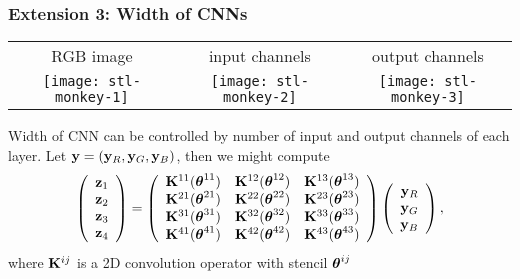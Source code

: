 \documentclass[12pt,fleqn,handout]{beamer}
\begin{document}
\begin{frame}\frametitle{Extension 3: Width of CNNs}
	
	\begin{center}
		\begin{tabular}{ccc}
			RGB image & input channels & output channels\\ 
			\texttt{[image: stl-monkey-1]}
			&
			\texttt{[image: stl-monkey-2]}
			&
			\texttt{[image: stl-monkey-3]}
		\end{tabular}
	\end{center}
	
	Width of CNN can be controlled by number of input and output channels of each layer. Let ${\bf y} = ({\bf y}_R, {\bf y}_G, {\bf y}_B)$, then we might compute
	$$
		\left(
			\begin{array}{r}
				{\bf z}_1 \\
				{\bf z}_2 \\
				{\bf z}_3 \\
				{\bf z}_4
			\end{array}
		\right)
		= 
		\left(
		\begin{array}{rrr}
			{\bf K}^{11}({\boldsymbol \theta}^{11}) &  {\bf K}^{12}({\boldsymbol \theta}^{12}) & {\bf K}^{13}({\boldsymbol \theta}^{13})\\
			{\bf K}^{21}({\boldsymbol \theta}^{21}) &  {\bf K}^{22}({\boldsymbol \theta}^{22}) & {\bf K}^{23}({\boldsymbol \theta}^{23})\\
			{\bf K}^{31}({\boldsymbol \theta}^{31}) &  {\bf K}^{32}({\boldsymbol \theta}^{32}) & {\bf K}^{33}({\boldsymbol \theta}^{33})\\
			{\bf K}^{41}({\boldsymbol \theta}^{41}) &  {\bf K}^{42}({\boldsymbol \theta}^{42}) & {\bf K}^{43}({\boldsymbol \theta}^{43})\\
		\end{array}
		\right)
		\left(
			\begin{array}{r}
				{\bf y}_R \\
				{\bf y}_G \\
				{\bf y}_B 
			\end{array}
		\right),
	$$
	where ${\bf K}^{ij}$ is a 2D convolution operator with stencil ${\boldsymbol \theta}^{ij}$
	
\end{frame}
\end{document}

